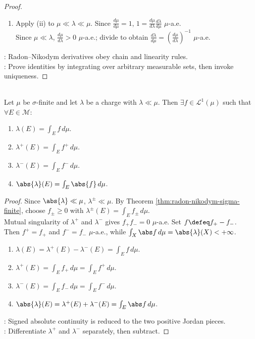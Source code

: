 \begin{proposition}
\begin{proof}
\begin{enumerate}[label=(\roman*)]
\item Apply (ii) to $\mu\ll\lambda\ll\mu$. Since $\frac{d\mu}{d\mu}=1$, $1=\frac{d\mu}{d\lambda}\frac{d\lambda}{d\mu}$ $\mu$-a.e.\\
Since $\mu\ll\lambda$, $\frac{d\mu}{d\lambda}>0$ $\mu$-a.e.; divide to obtain $\frac{d\lambda}{d\mu}=\left(\frac{d\mu}{d\lambda}\right)^{-1}$ $\mu$-a.e.
\end{enumerate}
: Radon--Nikodym derivatives obey chain and linearity rules.\\
: Prove identities by integrating over arbitrary measurable sets, then invoke uniqueness.
\end{proof}
\end{proposition}

\begin{corollary} \label{cor:radon-nikodym-for-charges} \\
Let $\mu$ be $\sigma$-finite and let $\lambda$ be a charge with $\lambda\ll\mu$. Then $\exists f\in\mathscr{L}^1(\mu)$ such that $\forall E\in\mathcal{M}$:
\begin{enumerate}[label=(\roman*)]
\setlength{\itemsep}{0pt}
\item $\lambda(E)=\int_E f\,d\mu$.
\item $\lambda^+(E)=\int_E f^+\,d\mu$.
\item $\lambda^-(E)=\int_E f^-\,d\mu$.
\item $\abs{\lambda}(E)=\int_E\abs{f}\,d\mu$.
\end{enumerate}
\begin{proof} Since $\abs{\lambda}\ll\mu$, $\lambda^\pm\ll\mu$. By Theorem \ref{thm:radon-nikodym-sigma-finite}, choose $f_\pm\geq0$ with $\lambda^\pm(E)=\int_Ef_\pm\,d\mu$.\\
Mutual singularity of $\lambda^+$ and $\lambda^-$ gives $f_+f_-=0$ $\mu$-a.e. Set $f\defeq f_+-f_-$.\\
Then $f^+=f_+$ and $f^-=f_-$ $\mu$-a.e., while $\int_X\abs f\,d\mu=\abs{\lambda}(X)<+\infty$.
\begin{enumerate}[label=(\roman*)]
\setlength{\itemsep}{0pt}
\item $\lambda(E)=\lambda^+(E)-\lambda^-(E)=\int_Ef\,d\mu$.
\item $\lambda^+(E)=\int_Ef_+\,d\mu=\int_Ef^+\,d\mu$.
\item $\lambda^-(E)=\int_Ef_-\,d\mu=\int_Ef^-\,d\mu$.
\item $\abs{\lambda}(E)=\lambda^+(E)+\lambda^-(E)=\int_E\abs f\,d\mu$.
\end{enumerate}
: Signed absolute continuity is reduced to the two positive Jordan pieces.\\
: Differentiate $\lambda^+$ and $\lambda^-$ separately, then subtract.
\end{proof}
\end{corollary}


